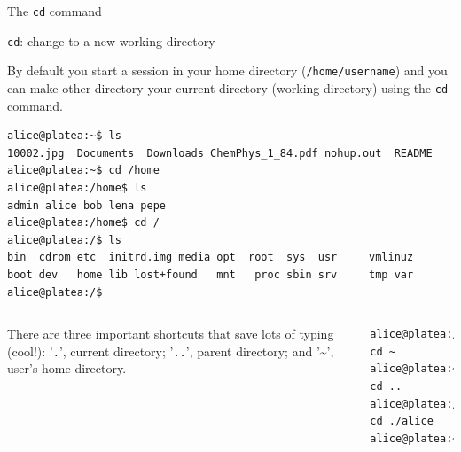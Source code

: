 \begin{frame}[fragile]{The \texttt{cd} command}
  
  \begin{block}{ \alert{\texttt{cd}}: change to a new working directory}
    
      {\footnotesize  By default you start a session in your home directory (\texttt{/home/username}) and you can make other directory your current directory (working directory) using the \texttt{cd} command.}

    {\scriptsize
      \begin{lstlisting}
alice@platea:~$ ls
10002.jpg  Documents  Downloads ChemPhys_1_84.pdf nohup.out  README
alice@platea:~$ cd /home
alice@platea:/home$ ls
admin alice bob lena pepe
alice@platea:/home$ cd /
alice@platea:/$ ls
bin  cdrom etc  initrd.img media opt  root  sys  usr     vmlinuz
boot dev   home lib lost+found   mnt   proc sbin srv     tmp var
alice@platea:/$
\end{lstlisting}
}

\begin{columns}
      {\footnotesize There are three important shortcuts that save lots of typing (cool!): '\texttt{.}', current directory; '\texttt{..}', parent directory; and '\textasciitilde', user's home directory.}
    {\scriptsize
      \begin{lstlisting}
alice@platea:/$ cd ~
alice@platea:~$ cd ..
alice@platea:/home$ cd ./alice
alice@platea:~$ 
\end{lstlisting}
}
\end{columns}

\end{block}


\end{frame}
